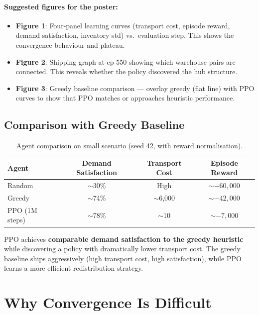 \documentclass[11pt]{article}
\begin{document}
\paragraph{Suggested figures for the poster:}
\begin{itemize}[nosep]
    \item \textbf{Figure 1}: Four-panel learning curves (transport cost, episode reward, demand satisfaction, inventory std) vs.\ evaluation step. This shows the convergence behaviour and plateau.
    \item \textbf{Figure 2}: Shipping graph at ep 550 showing which warehouse pairs are connected. This reveals whether the policy discovered the hub structure.
    \item \textbf{Figure 3}: Greedy baseline comparison --- overlay greedy (flat line) with PPO curves to show that PPO matches or approaches heuristic performance.
\end{itemize}

\subsection{Comparison with Greedy Baseline}

\begin{table}[H]
\centering
\begin{tabular}{lccc}
\toprule
Agent & Demand Satisfaction & Transport Cost & Episode Reward \\
\midrule
Random & $\sim$30\% & High & $\sim -60{,}000$ \\
Greedy & $\sim$74\% & $\sim$6{,}000 & $\sim -42{,}000$ \\
PPO (1M steps) & $\sim$78\% & $\sim$10 & $\sim -7{,}000$ \\
\bottomrule
\end{tabular}
\caption{Agent comparison on small scenario (seed 42, with reward normalisation).}
\end{table}

PPO achieves \textbf{comparable demand satisfaction to the greedy heuristic} while discovering a policy with dramatically lower transport cost. The greedy baseline ships aggressively (high transport cost, high satisfaction), while PPO learns a more efficient redistribution strategy.

\section{Why Convergence Is Difficult}
\end{document}
